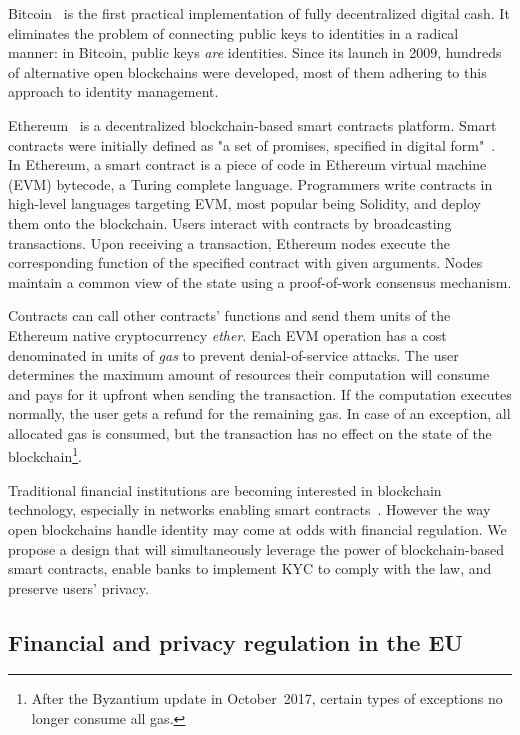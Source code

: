 Bitcoin~\cite{Nakamoto2008} is the first practical implementation of fully decentralized digital cash.
It eliminates the problem of connecting public keys to identities in a radical manner: in Bitcoin, public keys \textit{are} identities.
Since its launch in 2009, hundreds of alternative open blockchains were developed, most of them adhering to this approach to identity management.

Ethereum~\cite{Buterin2014, Wood2014} is a decentralized blockchain-based smart contracts platform.
Smart contracts were initially defined as "a set of promises, specified in digital form"~\cite{Szabo1996}.
In Ethereum, a smart contract is a piece of code in Ethereum virtual machine (EVM) bytecode, a Turing complete language.
Programmers write contracts in high-level languages targeting EVM, most popular being Solidity, and deploy them onto the blockchain.
Users interact with contracts by broadcasting transactions.
Upon receiving a transaction, Ethereum nodes execute the corresponding function of the specified contract with given arguments.
Nodes maintain a common view of the state using a proof-of-work consensus mechanism.

Contracts can call other contracts' functions and send them units of the Ethereum native cryptocurrency \textit{ether}.
Each EVM operation has a cost denominated in units of \textit{gas} to prevent denial-of-service attacks.
The user determines the maximum amount of resources their computation will consume and pays for it upfront when sending the transaction.
If the computation executes normally, the user gets a refund for the remaining gas.
In case of an exception, all allocated gas is consumed, but the transaction has no effect on the state of the blockchain\footnote{After the Byzantium update in October~2017, certain types of exceptions no longer consume all gas.}.


Traditional financial institutions are becoming interested in blockchain technology, especially in networks enabling smart contracts~\cite{Castillo2017}.
However the way open blockchains handle identity may come at odds with financial regulation.
We propose a design that will simultaneously leverage the power of blockchain-based smart contracts, enable banks to implement KYC to comply with the law, and preserve users' privacy.


\subsection{Financial and privacy regulation in the EU} \label{sec:Ch12_KYC_EU}

